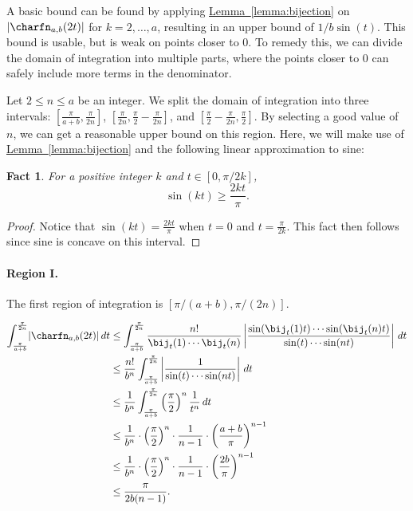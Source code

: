 \documentclass[11pt]{article}
\numberwithin{equation}{section}
\newtheorem{fact}[theorem]{Fact}
\theoremstyle{definition}
\theoremstyle{plain}
\newcommand{\expref}[2]{\hyperref[#2]{#1~\ref{#2}}}
\begin{document}
A basic bound can be found by applying \expref{Lemma}{lemma:bijection} on $\lvert\charfn_{a,b}(2t)\rvert$ for $k=2,\dots,a$, resulting in an upper bound of $1/b\sin(t)$. This bound is usable, but is weak on points closer to 0. To remedy this, we can divide the domain of integration into multiple parts, where the points closer to 0 can safely include more terms in the denominator.

Let $2\le n\le a$ be an integer. We split the domain of integration into three intervals: $[\frac{\pi}{a+b}, \frac{\pi}{2n}]$, $[\frac{\pi}{2n},  \frac{\pi}{2}- \frac{\pi}{2n}]$, and $[\frac{\pi}{2}-\frac{\pi}{2n},\frac{\pi}{2}]$. By selecting a good value of $n$, we can get a reasonable upper bound on this region.
Here, we will make use of \expref{Lemma}{lemma:bijection} and the following linear approximation to sine: 

\begin{fact}
    \label{fact:linearlowerbound}
    For a positive integer $k$ and $t\in [0, \pi/2k]$,
    \[\sin(kt)\ge \frac{2kt}{\pi }. \]
\end{fact}

\begin{proof}
    Notice that $\sin(kt)=\frac{2kt}{\pi}$ when $t=0$ and $t=\frac{\pi}{2k}$. This fact then follows since sine is concave on this interval.     
\end{proof}

\paragraph{Region I.}

The first region of integration is $[\pi/(a+b),\pi/(2n)]$.

\begin{align*}
    \int_{\frac{\pi}{a+b}}^{\frac{\pi}{2n}} \lvert\charfn_{a,b}(2t)\rvert\,dt &\le  \int_{\frac{\pi}{a+b}}^{\frac{\pi}{2n}} \frac{n!}{\bij_t(1)\cdots \bij_t(n)} \left\lvert \frac{\sin(\bij_t(1)t)\cdots \sin(\bij_t(n)t)}{\sin(t)\cdots \sin(nt)}\right\rvert \, dt \\
    &\le \frac{n!}{b^n}\int_{\frac{\pi}{a+b}}^{\frac{\pi}{2n}} \left\lvert\frac{1}{\sin(t)\cdots \sin(nt)} \right\rvert\,dt \\
    &\le \frac{1}{b^n}\int_{\frac{\pi}{a+b}}^{\frac{\pi}{2n}} \left(\frac{\pi}{2}\right)^n \frac{1}{t^n}\,dt\\
    &\le \frac{1}{b^n}\cdot \left(\frac{\pi}{2}\right)^n \cdot\frac{1}{n-1}\cdot \left(\frac{a+b}{\pi}\right)^{n-1}\\
    &\le \frac{1}{b^n}\cdot \left(\frac{\pi}{2}\right)^n \cdot\frac{1}{n-1}\cdot \left(\frac{2b}{\pi}\right)^{n-1}\\
    &\le \frac{\pi}{2b(n-1)}.
\end{align*}
\end{document}
